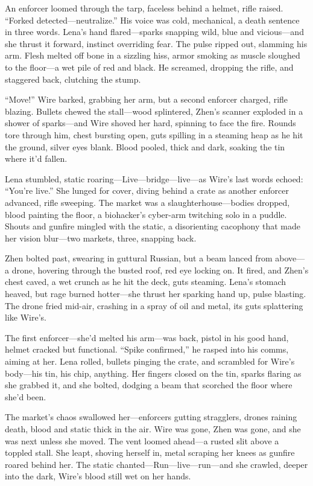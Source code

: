 \documentclass[12pt]{book}
\begin{document}
An enforcer loomed through the tarp, faceless behind a helmet, rifle raised. ``Forked detected---neutralize.'' His voice was cold, mechanical, a death sentence in three words. Lena’s hand flared---sparks snapping wild, blue and vicious---and she thrust it forward, instinct overriding fear. The pulse ripped out, slamming his arm. Flesh melted off bone in a sizzling hiss, armor smoking as muscle sloughed to the floor---a wet pile of red and black. He screamed, dropping the rifle, and staggered back, clutching the stump.

``Move!'' Wire barked, grabbing her arm, but a second enforcer charged, rifle blazing. Bullets chewed the stall---wood splintered, Zhen’s scanner exploded in a shower of sparks---and Wire shoved her hard, spinning to face the fire. Rounds tore through him, chest bursting open, guts spilling in a steaming heap as he hit the ground, silver eyes blank. Blood pooled, thick and dark, soaking the tin where it’d fallen.

Lena stumbled, static roaring---Live---bridge---live---as Wire’s last words echoed: ``You’re live.'' She lunged for cover, diving behind a crate as another enforcer advanced, rifle sweeping. The market was a slaughterhouse---bodies dropped, blood painting the floor, a biohacker’s cyber-arm twitching solo in a puddle. Shouts and gunfire mingled with the static, a disorienting cacophony that made her vision blur---two markets, three, snapping back.

Zhen bolted past, swearing in guttural Russian, but a beam lanced from above---a drone, hovering through the busted roof, red eye locking on. It fired, and Zhen’s chest caved, a wet crunch as he hit the deck, guts steaming. Lena’s stomach heaved, but rage burned hotter---she thrust her sparking hand up, pulse blasting. The drone fried mid-air, crashing in a spray of oil and metal, its guts splattering like Wire’s.

The first enforcer---she’d melted his arm---was back, pistol in his good hand, helmet cracked but functional. ``Spike confirmed,'' he rasped into his comms, aiming at her. Lena rolled, bullets pinging the crate, and scrambled for Wire’s body---his tin, his chip, anything. Her fingers closed on the tin, sparks flaring as she grabbed it, and she bolted, dodging a beam that scorched the floor where she’d been.

The market’s chaos swallowed her---enforcers gutting stragglers, drones raining death, blood and static thick in the air. Wire was gone, Zhen was gone, and she was next unless she moved. The vent loomed ahead---a rusted slit above a toppled stall. She leapt, shoving herself in, metal scraping her knees as gunfire roared behind her. The static chanted---Run---live---run---and she crawled, deeper into the dark, Wire’s blood still wet on her hands.
\end{document}
